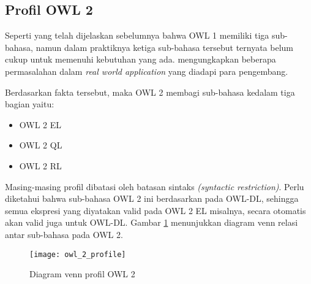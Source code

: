 \subsection{Profil OWL 2}
Seperti yang telah dijelaskan sebelumnya bahwa OWL 1 memiliki tiga sub-bahasa, namun dalam praktiknya ketiga sub-bahasa tersebut ternyata belum cukup untuk memenuhi kebutuhan yang ada. \citet{patel} mengungkapkan beberapa permasalahan dalam \emph{real world application} yang diadapi para pengembang.

Berdasarkan fakta tersebut, maka OWL 2 membagi sub-bahasa kedalam tiga bagian yaitu:
\begin{itemize}
	\item OWL 2 EL
	\item OWL 2 QL
	\item OWL 2 RL
\end{itemize}

Masing-masing profil dibatasi oleh batasan sintaks \emph{(syntactic restriction)}. Perlu diketahui bahwa sub-bahasa OWL 2 ini berdasarkan pada OWL-DL, sehingga semua ekspresi yang diyatakan valid pada OWL 2 EL misalnya, secara otomatis akan valid juga untuk OWL-DL. Gambar \ref{fig:owl_2_profile} menunjukkan diagram venn relasi antar sub-bahasa pada OWL 2.

\begin{figure}[h]
	\centering
	\texttt{[image: owl\_2\_profile]}
	\caption{Diagram venn profil OWL 2}
	\label{fig:owl_2_profile}
\end{figure}